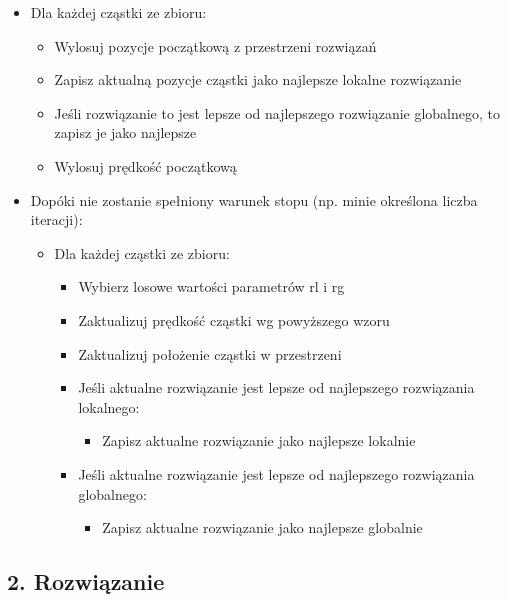 \documentclass[11pt]{article}
\providecommand{\tightlist}{%
      \setlength{\itemsep}{0pt}\setlength{\parskip}{0pt}}
\begin{document}
\begin{itemize}
\tightlist
\item
  Dla każdej cząstki ze zbioru:

  \begin{itemize}
  \tightlist
  \item
    Wylosuj pozycje początkową z przestrzeni rozwiązań
  \item
    Zapisz aktualną pozycje cząstki jako najlepsze lokalne rozwiązanie
  \item
    Jeśli rozwiązanie to jest lepsze od najlepszego rozwiązanie
    globalnego, to zapisz je jako najlepsze
  \item
    Wylosuj prędkość początkową
  \end{itemize}
\item
  Dopóki nie zostanie spełniony warunek stopu (np. minie określona
  liczba iteracji):

  \begin{itemize}
  \tightlist
  \item
    Dla każdej cząstki ze zbioru:

    \begin{itemize}
    \tightlist
    \item
      Wybierz losowe wartości parametrów rl i rg
    \item
      Zaktualizuj prędkość cząstki wg powyższego wzoru
    \item
      Zaktualizuj położenie cząstki w przestrzeni
    \item
      Jeśli aktualne rozwiązanie jest lepsze od najlepszego rozwiązania
      lokalnego:

      \begin{itemize}
      \tightlist
      \item
        Zapisz aktualne rozwiązanie jako najlepsze lokalnie
      \end{itemize}
    \item
      Jeśli aktualne rozwiązanie jest lepsze od najlepszego rozwiązania
      globalnego:

      \begin{itemize}
      \tightlist
      \item
        Zapisz aktualne rozwiązanie jako najlepsze globalnie
      \end{itemize}
    \end{itemize}
  \end{itemize}
\end{itemize}

    \hypertarget{rozwiux105zanie}{%
\subsection{2. Rozwiązanie}\label{rozwiux105zanie}}
\end{document}
